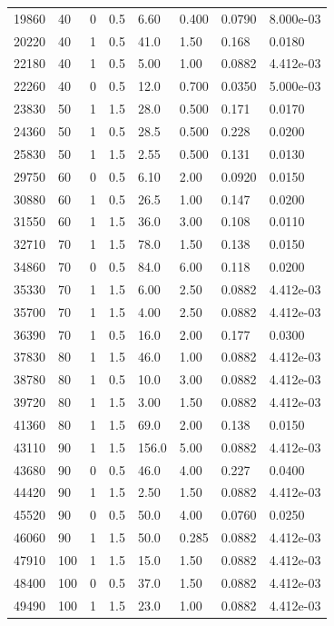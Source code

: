 \documentclass[preview]{standalone}
\begin{document}
{{\begin{tabular}{L{1.2cm}C{1.2cm} C{0.3cm}C{0.5cm} C{1.4cm}C{1.4cm} C{1.4cm}C{1.4cm}}
  19860  &    40  & 0     & 0.5 &  6.60  & 0.400  & 0.0790 &  8.000e-03   \\ 
  20220  &    40  & 1     & 0.5 &  41.0  & 1.50  & 0.168 &  0.0180   \\ 
  22180  &    40  & 1     & 0.5 &  5.00  & 1.00  & 0.0882 &  4.412e-03   \\ 
  22260  &    40  & 0     & 0.5 &  12.0  & 0.700  & 0.0350 &  5.000e-03   \\ 
  23830  &    50  & 1     & 1.5 &  28.0  & 0.500  & 0.171 &  0.0170   \\ 
  24360  &    50  & 1     & 0.5 &  28.5  & 0.500  & 0.228 &  0.0200   \\ 
  25830  &    50  & 1     & 1.5 &  2.55  & 0.500  & 0.131 &  0.0130   \\ 
  29750  &    60  & 0     & 0.5 &  6.10  & 2.00  & 0.0920 &  0.0150   \\ 
  30880  &    60  & 1     & 0.5 &  26.5  & 1.00  & 0.147 &  0.0200   \\ 
  31550  &    60  & 1     & 1.5 &  36.0  & 3.00  & 0.108 &  0.0110   \\ 
  32710  &    70  & 1     & 1.5 &  78.0  & 1.50  & 0.138 &  0.0150   \\ 
  34860  &    70  & 0     & 0.5 &  84.0  & 6.00  & 0.118 &  0.0200   \\ 
  35330  &    70  & 1     & 1.5 &  6.00  & 2.50  & 0.0882 &  4.412e-03   \\ 
  35700  &    70  & 1     & 1.5 &  4.00  & 2.50  & 0.0882 &  4.412e-03   \\ 
  36390  &    70  & 1     & 0.5 &  16.0  & 2.00  & 0.177 &  0.0300   \\ 
  37830  &    80  & 1     & 1.5 &  46.0  & 1.00  & 0.0882 &  4.412e-03   \\ 
  38780  &    80  & 1     & 0.5 &  10.0  & 3.00  & 0.0882 &  4.412e-03   \\ 
  39720  &    80  & 1     & 1.5 &  3.00  & 1.50  & 0.0882 &  4.412e-03   \\ 
  41360  &    80  & 1     & 1.5 &  69.0  & 2.00  & 0.138 &  0.0150   \\ 
  43110  &    90  & 1     & 1.5 &  156.0  & 5.00  & 0.0882 &  4.412e-03   \\ 
  43680  &    90  & 0     & 0.5 &  46.0  & 4.00  & 0.227 &  0.0400   \\ 
  44420  &    90  & 1     & 1.5 &  2.50  & 1.50  & 0.0882 &  4.412e-03   \\ 
  45520  &    90  & 0     & 0.5 &  50.0  & 4.00  & 0.0760 &  0.0250   \\ 
  46060  &    90  & 1     & 1.5 &  50.0  & 0.285  & 0.0882 &  4.412e-03   \\ 
  47910  &   100  & 1     & 1.5 &  15.0  & 1.50  & 0.0882 &  4.412e-03   \\ 
  48400  &   100  & 0     & 0.5 &  37.0  & 1.50  & 0.0882 &  4.412e-03   \\ 
  49490  &   100  & 1     & 1.5 &  23.0  & 1.00  & 0.0882 &  4.412e-03   \\ 
\hline 
\end{tabular} 

}}
\end{document}
